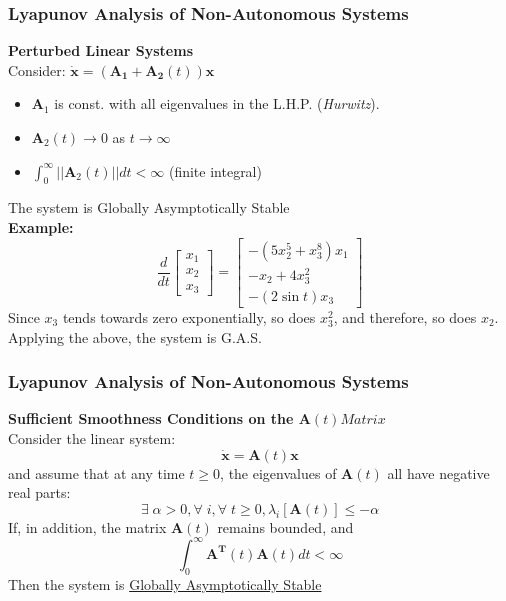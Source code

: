 \documentclass[11pt,handout]{beamer}   %
\begin{document}
\begin{frame}
\frametitle{Lyapunov Analysis of Non-Autonomous Systems}
\small
\textbf{Perturbed Linear Systems}\\
Consider: $\mathbf{\dot{x}} = (\mathbf{A_1 + A_2}(t))\mathbf{x}$\\
\begin{itemize}
\item $\mathbf{A}_1$ is const. with all eigenvalues in the L.H.P. (\textit{Hurwitz}).
\item $\mathbf{A}_2(t) \rightarrow 0 $ as $t \rightarrow \infty$  
\item $\int_{0}^{\infty} || \mathbf{A}_2(t) || dt < \infty$ (finite integral)
\end{itemize}
The system is Globally Asymptotically Stable\\
\vspace{6pt}
\textbf{Example:}\\
\begin{equation*}
\frac{d}{dt}
\begin{bmatrix}
x_1 \\ x_2 \\ x_3
\end{bmatrix} = \begin{bmatrix}
-(5 x_2^5 + x_3^8)x_1\\
-x_2 + 4 x_3^2\\
-(2 \sin t) x_3
\end{bmatrix}
\end{equation*}
Since $x_3$ tends towards zero exponentially, so does $x_3^2$, and therefore, so does $x_2$. Applying the above, the system is G.A.S.\\
\end{frame}

\begin{frame}
\frametitle{Lyapunov Analysis of Non-Autonomous Systems}
\small
\textbf{Sufficient Smoothness Conditions on the $\mathbf{A}(t) Matrix$}\\
Consider the linear system: \begin{equation*}
\mathbf{\dot{x}} = \mathbf{A}(t)\mathbf{x}
\end{equation*} and assume that at any time $t \geq 0$, the eigenvalues of $\mathbf{A}(t)$ all have negative real parts:
\begin{equation*}
\exists \; \alpha >0 , \forall \; i, \forall \; t \geq 0, \lambda_i [\mathbf{A}(t)]\leq - \alpha
\end{equation*}
If, in addition, the matrix $\mathbf{A}(t)$ remains bounded, and
\begin{equation*}
\int_{0}^{\infty} \mathbf{A^T}(t) \mathbf{A}(t) dt < \infty
\end{equation*}
Then the system is \underline{Globally Asymptotically Stable}
\end{frame}
\end{document}
